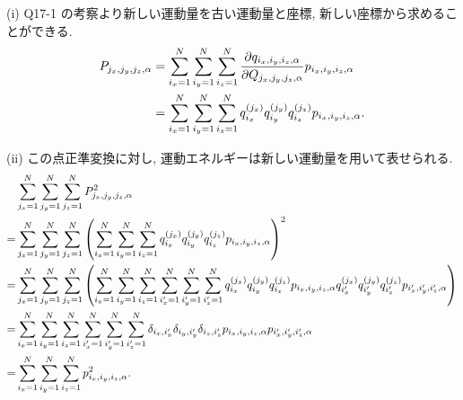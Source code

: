 \documentclass[uplatex,dvipdfmx,a4paper,11pt]{jlreq}
\theoremstyle{definition}
\begin{document}
(i) Q17-1 の考察より新しい運動量を古い運動量と座標, 新しい座標から求めることができる.
\begin{align}
  P_{j_x,j_y,j_z,\alpha} & = \sum_{i_x=1}^{N}\sum_{i_y=1}^{N}\sum_{i_z=1}^{N}\pdv{q_{i_x,i_y,i_z,\alpha}}{Q_{j_x,j_y,j_z,\alpha}}p_{i_x,i_y,i_z,\alpha} \\
                         & = \sum_{i_x=1}^{N}\sum_{i_y=1}^{N}\sum_{i_z=1}^{N}q_{i_x}^{(j_x)}q_{i_y}^{(j_y)}q_{i_z}^{(j_z)}p_{i_x,i_y,i_z,\alpha}.
\end{align}

(ii) この点正準変換に対し, 運動エネルギーは新しい運動量を用いて表せられる.
\begin{align}
    & \sum_{j_x=1}^{N}\sum_{j_y=1}^{N}\sum_{j_z=1}^{N}P_{j_x,j_y,j_z,\alpha}^2                                                                                                                                                                                                                              \\
  = & \sum_{j_x=1}^{N}\sum_{j_y=1}^{N}\sum_{j_z=1}^{N}\qty(\sum_{i_x=1}^{N}\sum_{i_y=1}^{N}\sum_{i_z=1}^{N}q_{i_x}^{(j_x)}q_{i_y}^{(j_y)}q_{i_z}^{(j_z)}p_{i_x,i_y,i_z,\alpha})^2                                                                                                                           \\
  = & \sum_{j_x=1}^{N}\sum_{j_y=1}^{N}\sum_{j_z=1}^{N}\qty(\sum_{i_x=1}^{N}\sum_{i_y=1}^{N}\sum_{i_z=1}^{N}\sum_{i_x'=1}^{N}\sum_{i_y'=1}^{N}\sum_{i_z'=1}^{N}q_{i_x}^{(j_x)}q_{i_y}^{(j_y)}q_{i_z}^{(j_z)}p_{i_x,i_y,i_z,\alpha}q_{i_x'}^{(j_x)}q_{i_y'}^{(j_y)}q_{i_z'}^{(j_z)}p_{i_x',i_y',i_z',\alpha}) \\
  = & \sum_{i_x=1}^{N}\sum_{i_y=1}^{N}\sum_{i_z=1}^{N}\sum_{i_x'=1}^{N}\sum_{i_y'=1}^{N}\sum_{i_z'=1}^{N}\delta_{i_x,i_x'}\delta_{i_y,i_y'}\delta_{i_z,i_z'}p_{i_x,i_y,i_z,\alpha}p_{i_x',i_y',i_z',\alpha}                                                                                                 \\
  = & \sum_{i_x=1}^{N}\sum_{i_y=1}^{N}\sum_{i_z=1}^{N}p_{i_x,i_y,i_z,\alpha}^2.
\end{align}
\end{document}
